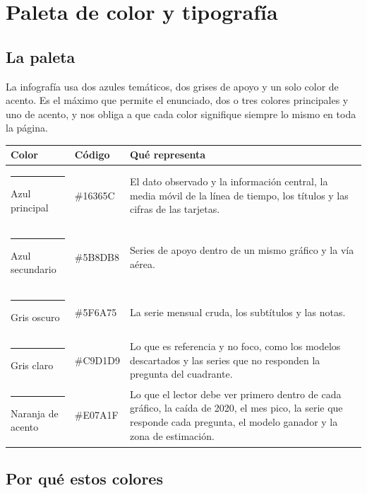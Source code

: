 \section{Paleta de color y tipografía}
\label{sec:paleta}

\newcommand{\muestra}[1]{\textcolor{#1}{\rule{1.6em}{0.85em}}}

\subsection{La paleta}

La infografía usa dos azules temáticos, dos grises de apoyo y un solo color de acento. Es el
máximo que permite el enunciado, dos o tres colores principales y uno de acento, y nos obliga a
que cada color signifique siempre lo mismo en toda la página.

\begin{center}
\begin{tabularx}{\textwidth}{@{}llX@{}}
\toprule
Color & Código & Qué representa \\
\midrule
\muestra{azulprincipal} Azul principal & \#16365C & El dato observado y la información central, la media móvil de la
línea de tiempo, los títulos y las cifras de las tarjetas. \\
\muestra{azulsecundario} Azul secundario & \#5B8DB8 & Series de apoyo dentro de un mismo gráfico y la vía aérea. \\
\muestra{grisoscuro} Gris oscuro & \#5F6A75 & La serie mensual cruda, los subtítulos y las notas. \\
\muestra{grisclaro} Gris claro & \#C9D1D9 & Lo que es referencia y no foco, como los modelos descartados y las
series que no responden la pregunta del cuadrante. \\
\muestra{acento} Naranja de acento & \#E07A1F & Lo que el lector debe ver primero dentro de cada gráfico, la caída de
2020, el mes pico, la serie que responde cada pregunta, el modelo ganador y la zona de
estimación. \\
\bottomrule
\end{tabularx}
\end{center}

\subsection{Por qué estos colores}

